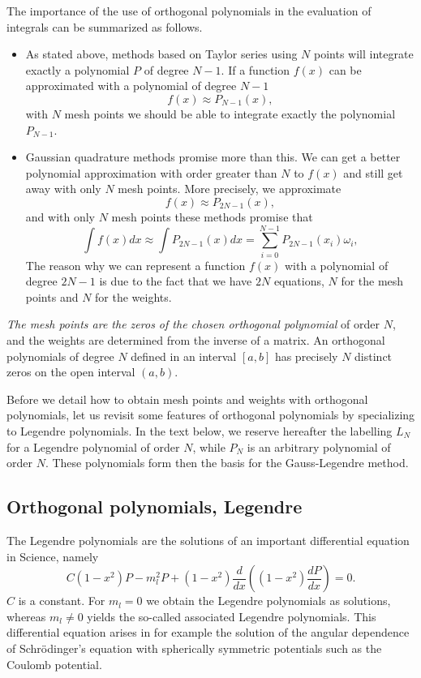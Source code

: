 The importance of the use of orthogonal polynomials in the evaluation
of integrals can be summarized as follows.
\begin{itemize} 
  \item As stated above, methods based on Taylor series using $N$ points will
        integrate exactly a polynomial $P$ of degree $N-1$. If a function $f(x)$
        can be approximated with a polynomial of degree $N-1$
        \[ 
          f(x)\approx P_{N-1}(x), 
        \]
         with $N$ mesh points we should be able to integrate exactly the 
         polynomial $P_{N-1}$. 
   \item Gaussian quadrature methods promise more than this. We can get a better
         polynomial approximation with order greater than $N$  to $f(x)$ and still
         get away with only $N$ mesh points. More precisely, we approximate
         \[
            f(x) \approx P_{2N-1}(x),
         \]
         and with only $N$ mesh points these methods promise that 
         \[
            \int f(x)dx \approx \int P_{2N-1}(x)dx=\sum_{i=0}^{N-1} P_{2N-1}(x_i)\omega_i,
         \]
         The reason why we can represent a function $f(x)$ with a polynomial of degree
         $2N-1$ is due to the fact that we have $2N$ equations, $N$ for the mesh points and $N$
         for the weights. 
\end{itemize}
{\em The mesh points are the zeros  of the chosen  orthogonal polynomial} of
order $N$, and the weights are determined from the inverse of a matrix.
An orthogonal polynomials of degree $N$ defined in an interval $[a,b]$
has precisely $N$ distinct zeros on the open interval $(a,b)$. 
 
Before we detail how to obtain mesh points and weights with orthogonal 
polynomials, let us revisit some features of orthogonal polynomials
by specializing to Legendre polynomials. In the text below, we reserve 
hereafter the labelling
$L_N$ for a Legendre polynomial of order $N$, while $P_N$ is an arbitrary polynomial
of order $N$. 
These polynomials form then the basis for the Gauss-Legendre method. 

\subsection{Orthogonal polynomials, Legendre} 


The Legendre polynomials are the solutions of an important
differential equation in Science, namely
\[
C(1-x^2)P-m_l^2P+(1-x^2)\frac{d}{dx}\left((1-x^2)\frac{dP}{dx}\right)=0.
\]
$C$ is a constant. For $m_l=0$ we obtain the Legendre polynomials
as solutions, whereas $m_l \ne 0$ yields the so-called associated Legendre
polynomials. This differential equation arises in for example the solution
of the angular dependence of Schr\"odinger's 
equation with spherically symmetric potentials such as
the Coulomb potential. 

